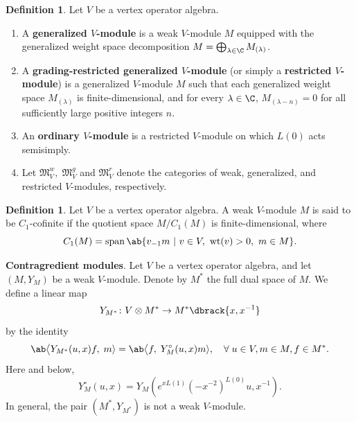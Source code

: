\documentclass[12pt, english]{article}
\numberwithin{equation}{section}
\DeclareMathOperator{\wt}{wt}
\theoremstyle{plain}
\theoremstyle{definition}
\newtheorem{definition}[lemma]{Definition}
\theoremstyle{remark}
\begin{document}
	\begin{definition}
		
		Let $V$ be a vertex operator algebra.
		
		\begin{enumerate}[label=(\arabic*),ref=\arabic*]
			\item A \textbf{ generalized $V$-module} is a weak $V$-module $M$ equipped with the generalized weight space decomposition $M = \bigoplus_{\lambda \in \C} M_{(\lambda)}$.
			
			\item A \textbf{grading-restricted generalized $V$-module} (or simply a \textbf{restricted $V$-module}) is a generalized $V$-module $M$ such that each generalized weight space $M_{(\lambda)}$ is finite-dimensional, and for every $\lambda \in \C$, $M_{(\lambda-n)} = 0$ for all sufficiently large positive integers $n$.
			
			\item  An \textbf{ordinary $V$-module} is a restricted $V$-module on which $L(0)$ acts semisimply.
			
			\item Let $ \mathfrak{M}^w_V, \; \mathfrak{M}^g_V$ and $ \mathfrak{M}^r_V $  denote the categories of weak, generalized, and restricted $V$-modules, respectively.
			
		\end{enumerate}
		
	\end{definition}
	
	\begin{definition}
		Let $V$ be a vertex operator algebra. A weak $V$-module $M$ is said to be $C_1$-cofinite if the quotient space $M/C_1(M)$ is finite-dimensional,
		where
		\[
		C_1(M) = \operatorname{span}\ab\{ v_{-1}m \ | \ v \in V, \  \wt (v) > 0, \ m \in M \}.
		\]
	\end{definition}
	
	\noindent \textbf{Contragredient modules}.
	Let $V$ be a vertex operator algebra, and let $(M, Y_M)$ be a  weak  $V$-module.
	Denote by $M^*$ the full dual space of $M$. We define a linear map
	\[
	Y_{M^*} \colon V \otimes M^* \to M^*\dbrack{x, x^{-1}}
	\]
	by the identity
	\begin{equation}\label{eq:full-dual-action}
		\ab\big\langle Y_{M^*}(u, x) f, \; m\rangle = \ab\big\langle f, \; Y_M^{\circ}(u, x) m\rangle, \quad \forall \; u \in V, m \in M, f \in M^*.
	\end{equation}
	Here and below,
	\begin{equation}
		Y_{M}^{\circ}(u, x) = Y_{M}(e^{xL(1)}(-x^{-2})^{L(0)}u, x^{-1}).
	\end{equation}
	In general, the pair $(M^*, Y_{M^*})$ is not a weak $V$-module.
	
\end{document}
